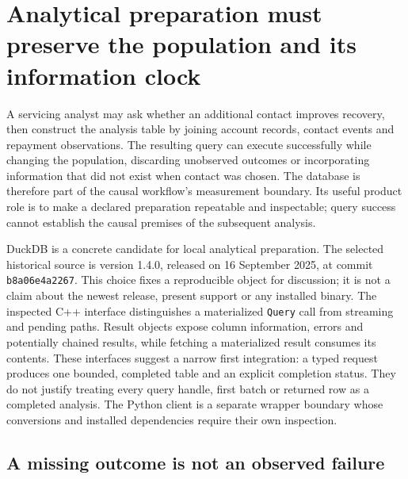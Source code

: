 \section{Analytical preparation must preserve the population and its information clock}
\label{exec19:duckdb-preparation}

A servicing analyst may ask whether an additional contact improves recovery,
then construct the analysis table by joining account records, contact events
and repayment observations. The resulting query can execute successfully while
changing the population, discarding unobserved outcomes or incorporating
information that did not exist when contact was chosen. The database is
therefore part of the causal workflow's measurement boundary. Its useful
product role is to make a declared preparation repeatable and inspectable;
query success cannot establish the causal premises of the subsequent analysis.

DuckDB is a concrete candidate for local analytical preparation. The selected
historical source is version 1.4.0, released on 16 September 2025, at commit
\texttt{b8a06e4a2267}. This choice fixes a reproducible object for discussion;
it is not a claim about the newest release, present support or any installed
binary. The inspected C++ interface distinguishes a materialized
\texttt{Query} call from streaming and pending paths. Result objects expose
column information, errors and potentially chained results, while fetching a
materialized result consumes its contents. These interfaces suggest a narrow
first integration: a typed request produces one bounded, completed table and
an explicit completion status. They do not justify treating every query handle,
first batch or returned row as a completed analysis. The Python client is a
separate wrapper boundary whose conversions and installed dependencies require
their own inspection.~\citep{exec19_duckdb_source}

\subsection{A missing outcome is not an observed failure}
\label{exec19:duckdb-missingness}

